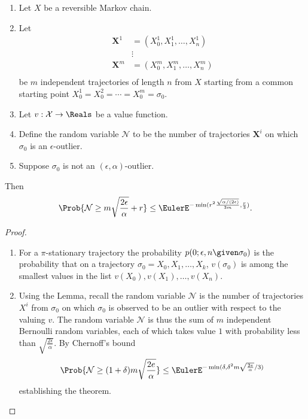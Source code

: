 \documentclass[12pt]{article}
\begin{document}
\begin{theorem}
    \label{thm:parallelsignificance:thm3point1}
    \begin{enumerate}
        \item
            Let \( X \) be a reversible Markov chain.
        \item
            Let
            \begin{align*}
                \mathbf{X}^1 &= (X_0^1, X_1^1, \dots, X_n^1 )\\
                &\vdots \\
                \mathbf{X}^m &= (X_0^m, X_1^m, \dots, X_n^m )\\
            \end{align*}
            be \( m \) independent trajectories of length \( n \) from \(
            X \) starting from a common starting point \( X_0^1 = X_0^2
            = \cdots = X_0^m = \sigma_0 \).
        \item
            Let \( v :  \mathcal{X} \to \Reals \) be a value function.
        \item
            Define the random variable \( \mathcal{N} \) to be the
            number of trajectories \( \mathbf{X}^i \) on which \( \sigma_0
            \) is an \( \epsilon \)-outlier.
        \item
            Suppose \( \sigma_0 \) is not an \( (\epsilon, \alpha) \)-outlier.
    \end{enumerate}
    Then
    \[
        \Prob{\mathcal{N} \ge m \sqrt{\frac{2\epsilon}{\alpha}} + r} \le
        \EulerE^{-\min(r^2 \frac{\sqrt{\alpha/(2\epsilon)}}{3m}, \frac{r}
        {3})}.
    \]
\end{theorem}

\begin{proof}
    \begin{enumerate}
        \item
            For a \( \pi \)-stationary trajectory the probability \( p(0;
            \epsilon, n \given \sigma_0) \) is the probability that on a
            trajectory \( \sigma_0 = X_0, X_1, \dots, X_k \), \( v(\sigma_0)
            \) is among the smallest values in the list \( v(X_0), v(X_1),
            \dots, v(X_n) \).
        \item
            Using the Lemma, recall the random variable \( \mathcal{N} \)
            is the number of trajectories \( X^i \) from \( \sigma_0 \)
            on which \( \sigma_0 \) is observed to be an outlier with
            respect to the valuing \( v \).  The random variable \(
            \mathcal{N} \) is thus the sum of \( m \) independent
            Bernoulli random variables, each of which takes value \( 1 \)
            with probability less than \( \sqrt{\frac{2 \epsilon}{\alpha}}
            \).  By Chernoff's bound
            \[
                \Prob{\mathcal{N} \ge (1 + \delta) m \sqrt{\frac{2e}{\alpha}}
                } \le \EulerE^{ -\min (\delta, \delta^2 m \sqrt{\frac{2e}
                {\alpha}}/3)}
            \] establishing the theorem.
    \end{enumerate}
\end{proof}
\end{document}
